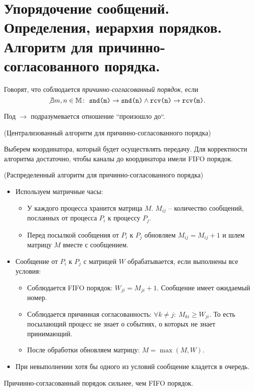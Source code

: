 \section{Упорядочение сообщений. Определения, иерархия порядков. Алгоритм для причинно-согласованного порядка.}

\begin{definition}
    Говорят, что соблюдается \textit{причинно-согласованный порядок}, если
    \[
        \not \exists m,n \in \mathbb{M} \colon~ \texttt{snd(m)} \rightarrow \texttt{snd(n)}
        \wedge \texttt{rcv(n)} \rightarrow \texttt{rcv(m)}
    .\]
\end{definition}

\begin{remark}
    Под $\to$ подразумевается отношение ``произошло до``.
\end{remark}

\begin{algorithm}(Централизованный алгоритм для причинно-согласованного порядка)

    Выберем координатора, который будет осуществлять передачу. Для корректности алгоритма достаточно, чтобы каналы до координатора имели FIFO порядок.
\end{algorithm}

\begin{algorithm}(Распределенный алгоритм для причинно-согласованного порядка)

    \begin{itemize}
        \item Используем матричные часы:
        \begin{itemize}
            \item У каждого процесса хранится матрица $M$. $M_{ij}$ -- количество сообщений, посланных от процесса $P_i$ к процессу $P_j$.
            \item Перед посылкой сообщения от $P_i$ к $P_j$ обновляем $M_{ij} = M_{ij} + 1$ и шлем матрицу $M$ вместе с сообщением.
        \end{itemize}
        \item Сообщение от $P_i$ к $P_j$ с матрицей $W$ обрабатывается, если выполнены все условия:
        \begin{itemize}
            \item Соблюдается FIFO порядок: $W_{ji} = M_{ji} + 1$. Сообщение имеет ожидаемый номер.
            \item Соблюдается причинная согласованность: $\forall k \not = j \colon~ M_{ki} \geqslant W_{ji}$. То есть посылающий процесс не знает о событиях, о которых не знает принимающий.
            \item После обработки обновляем матрицу: $M = \max{(M, W)}$.
        \end{itemize}
        \item При невыполнении хотя бы одного из условий сообщение кладется в очередь.
    \end{itemize}

\end{algorithm}

\begin{remark}
    Причинно-согласованный порядок сильнее, чем FIFO порядок.
\end{remark}
